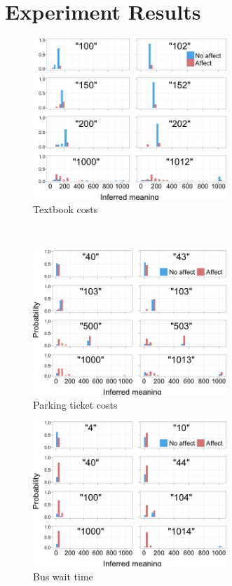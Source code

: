 \documentclass{article} %
\begin{document}
\section{Experiment Results}
\qquad
\begin{figure}[h]
	\centering
	\includegraphics[width=0.65\textwidth]{humans_textbook_all.png}
	\caption{Textbook costs}
\end{figure}
\qquad
\\
\begin{figure}[h]
	\centering
	\includegraphics[width=0.65\textwidth]{humans_ticket_all.png}
	\caption{Parking ticket costs}
\end{figure}

\begin{figure}[t]
	\centering
	\includegraphics[width=0.65\textwidth]{humans_bus_all.png}
	\caption{Bus wait time}
\end{figure}
\end{document}
